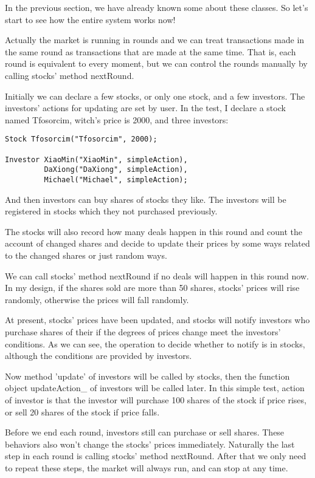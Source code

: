 \documentclass{article}
\begin{document}
    In the previous section, we have already known some about these classes. So let's start to see how the entire system works now!
    
    Actually the market is running in rounds and we can treat transactions made in the same round as transactions that are made at the same time. That is, each round is equivalent to every moment, but we can control the rounds manually by calling stocks' method nextRound.
    
    Initially we can declare a few stocks, or only one stock, and a few investors. The investors' actions for updating are set by user. In the test, I declare a stock named Tfosorcim, witch's price is 2000, and three investors:
    
\begin{lstlisting}
Stock Tfosorcim("Tfosorcim", 2000);

Investor XiaoMin("XiaoMin", simpleAction),
         DaXiong("DaXiong", simpleAction),
         Michael("Michael", simpleAction);
\end{lstlisting}
    
    And then investors can buy shares of stocks they like. The investors will be registered in stocks which they not purchased previously.
    
    The stocks will also record how many deals happen in this round and count the account of changed shares and decide to update their prices by some ways related to the changed shares or just random ways.
    
    We can call stocks' method nextRound if no deals will happen in this round now. In my design, if the shares sold are more than 50 shares, stocks' prices will rise randomly, otherwise the prices will fall randomly.
    
    At present, stocks' prices have been updated, and stocks will notify investors who purchase shares of their if the degrees of prices change meet the investors' conditions. As we can see, the operation to decide whether to notify is in stocks, although the conditions are provided by investors.
    
    Now method 'update' of investors will be called by stocks, then the function object updateAction\_ of investors will be called later. In this simple test, action of investor is that the investor will purchase 100 shares of the stock if price rises, or sell 20 shares of the stock if price falls.
    
    Before we end each round, investors still can purchase or sell shares. These behaviors also won't change the stocks' prices immediately. Naturally the last step in each round is calling stocks' method nextRound. After that we only need to repeat these steps, the market will always run, and can stop at any time.
\end{document}
